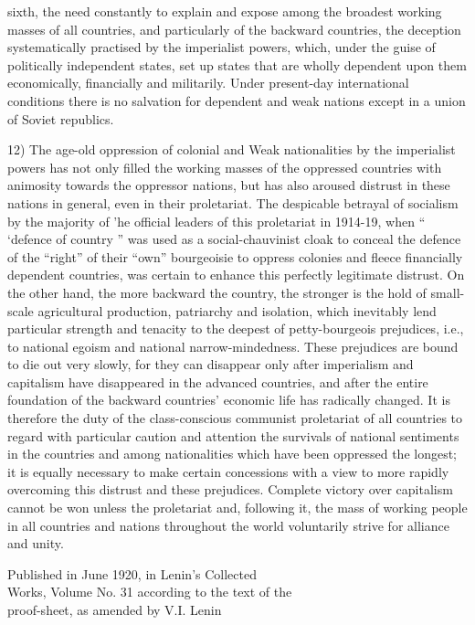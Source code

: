 sixth, the need constantly to explain and expose among the broadest working masses of all countries, and particularly of the backward countries, the deception systematically practised by the imperialist powers, which, under the guise of politically independent states, set up states that are wholly dependent upon them economically, financially and militarily. Under present-day international conditions there is no salvation for dependent and weak nations except in a union of Soviet republics. 

12) The age-old oppression of colonial and Weak nationalities by the imperialist powers has not only filled the working masses of the oppressed countries with animosity towards the oppressor nations, but has also aroused distrust in these nations in general, even in their proletariat. 
The despicable betrayal of socialism by the majority of 'he official leaders of this proletariat in 1914-19, when “ ‘defence of country ” was used as a social-chauvinist cloak to conceal the defence of the “right” of their “own” bourgeoisie to oppress colonies and fleece financially 
dependent countries, was certain to enhance this perfectly legitimate distrust. On the other hand, the more backward the country, the stronger is the hold of small-scale agricultural production, patriarchy and isolation, which inevitably lend particular strength and tenacity to the deepest of petty-bourgeois prejudices, i.e., to national egoism and national narrow-mindedness. These prejudices are bound to die out very slowly, for they can disappear only after imperialism and capitalism have disappeared in the advanced countries, and after the entire foundation of the backward countries’ economic life has radically changed. It is therefore the duty of the class-conscious communist proletariat of all countries to regard with particular caution and attention the survivals of national sentiments in the countries and among nationalities which have been oppressed the longest; it is equally necessary to make certain concessions with a view to more rapidly overcoming this distrust and these prejudices. Complete victory over capitalism cannot be won unless the proletariat and, following it, the mass of working people in all countries and nations throughout the world voluntarily strive for alliance and unity. 

\begin{flushright}
Published in June 1920, in Lenin’s Collected \\
Works, Volume No. 31 according to the text of the \\
proof-sheet, as amended by V.I. Lenin \\
\end{flushright}

